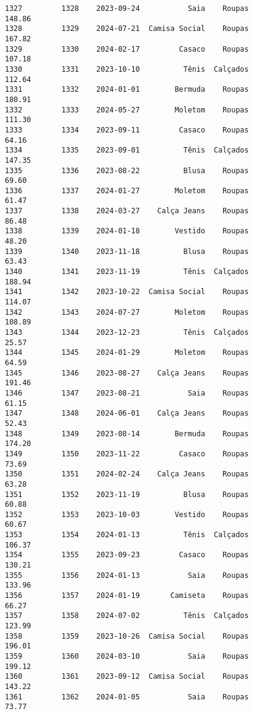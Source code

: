 \documentclass[11pt]{article}
\begin{document}
\begin{Verbatim}[commandchars=\\\{\}]
1327         1328    2023-09-24           Saia    Roupas          148.86   
1328         1329    2024-07-21  Camisa Social    Roupas          167.82   
1329         1330    2024-02-17         Casaco    Roupas          107.18   
1330         1331    2023-10-10          Tênis  Calçados          112.64   
1331         1332    2024-01-01        Bermuda    Roupas          180.91   
1332         1333    2024-05-27        Moletom    Roupas          111.30   
1333         1334    2023-09-11         Casaco    Roupas           64.16   
1334         1335    2023-09-01          Tênis  Calçados          147.35   
1335         1336    2023-08-22          Blusa    Roupas           69.60   
1336         1337    2024-01-27        Moletom    Roupas           61.47   
1337         1338    2024-03-27    Calça Jeans    Roupas           86.48   
1338         1339    2024-01-18        Vestido    Roupas           48.20   
1339         1340    2023-11-18          Blusa    Roupas           63.43   
1340         1341    2023-11-19          Tênis  Calçados          188.94   
1341         1342    2023-10-22  Camisa Social    Roupas          114.07   
1342         1343    2024-07-27        Moletom    Roupas          108.89   
1343         1344    2023-12-23          Tênis  Calçados           25.57   
1344         1345    2024-01-29        Moletom    Roupas           64.59   
1345         1346    2023-08-27    Calça Jeans    Roupas          191.46   
1346         1347    2023-08-21           Saia    Roupas           61.15   
1347         1348    2024-06-01    Calça Jeans    Roupas           52.43   
1348         1349    2023-08-14        Bermuda    Roupas          174.20   
1349         1350    2023-11-22         Casaco    Roupas           73.69   
1350         1351    2024-02-24    Calça Jeans    Roupas           63.28   
1351         1352    2023-11-19          Blusa    Roupas           60.88   
1352         1353    2023-10-03        Vestido    Roupas           60.67   
1353         1354    2024-01-13          Tênis  Calçados          106.37   
1354         1355    2023-09-23         Casaco    Roupas          130.21   
1355         1356    2024-01-13           Saia    Roupas          133.96   
1356         1357    2024-01-19       Camiseta    Roupas           66.27   
1357         1358    2024-07-02          Tênis  Calçados          123.99   
1358         1359    2023-10-26  Camisa Social    Roupas          196.01   
1359         1360    2024-03-10           Saia    Roupas          199.12   
1360         1361    2023-09-12  Camisa Social    Roupas          143.22   
1361         1362    2024-01-05           Saia    Roupas           73.77   

\end{Verbatim}
\end{document}

